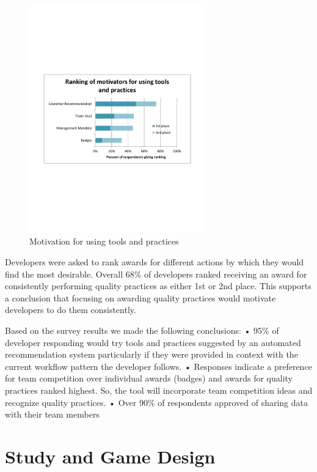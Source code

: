 \documentclass{sig-alternate}
\begin{document}
\begin{figure}\begin{mdframed}[linecolor=white]
	\includegraphics[width=3in]{ToolAndPracticeMotivators.pdf}
	\caption{Motivation for using tools and practices}
	\label{fig:toolandpracticemotivators}
\end{mdframed}\end{figure}

Developers were asked to rank awards for different actions by which they would find the most desirable.  Overall 68\% of developers ranked receiving an award for consistently performing quality practices as either 1st or 2nd place.  This supports a conclusion that focusing on awarding quality practices would motivate developers to do them consistently.
 
Based on the survey results we made the following conclusions:
•	95\% of developer responding would try tools and practices suggested by an automated recommendation system particularly if they were provided in context with the current workflow pattern the developer follows.
•	Responses indicate a preference for team competition over individual awards (badges) and awards for quality practices ranked highest.  So, the tool will incorporate team competition ideas and recognize quality practices.
•	Over 90\% of respondents approved of sharing data with their team members


\section{Study and Game Design}
\end{document}
